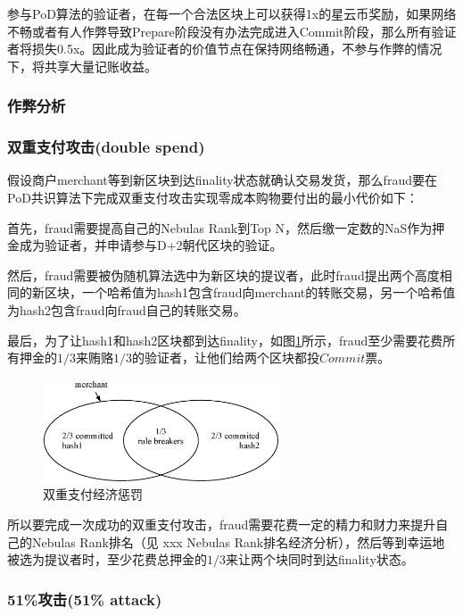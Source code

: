 参与PoD算法的验证者，在每一个合法区块上可以获得1x的星云币奖励，如果网络不畅或者有人作弊导致Prepare阶段没有办法完成进入Commit阶段，那么所有验证者将损失0.5x。因此成为验证者的价值节点在保持网络畅通，不参与作弊的情况下，将共享大量记账收益。

\subsubsection{作弊分析}
\label{pod:economic:fraud}

\subsubsection*{双重支付攻击(double spend)}
\label{pod:economic:fraud:double_spend}

假设商户merchant等到新区块到达finality状态就确认交易发货，那么fraud要在PoD共识算法下完成双重支付攻击实现零成本购物要付出的最小代价如下：

首先，fraud需要提高自己的Nebulas Rank到Top N，然后缴一定数的NaS作为押金成为验证者，并申请参与D+2朝代区块的验证。

然后，fraud需要被伪随机算法选中为新区块的提议者，此时fraud提出两个高度相同的新区块，一个哈希值为hash1包含fraud向merchant的转账交易，另一个哈希值为hash2包含fraud向fraud自己的转账交易。

最后，为了让hash1和hash2区块都到达finality，如图\ref{fig:double_spend}所示，fraud至少需要花费所有押金的$1/3$来贿赂$1/3$的验证者，让他们给两个区块都投$Commit$票。

\begin{figure}[h]
\centering
\includegraphics[width=7cm]{./figs/overlap}
\caption{双重支付经济惩罚}
\label{fig:double_spend}
\end{figure}

所以要完成一次成功的双重支付攻击，fraud需要花费一定的精力和财力来提升自己的Nebulas Rank排名（见 xxx Nebulas Rank排名经济分析），然后等到幸运地被选为提议者时，至少花费总押金的$1/3$来让两个块同时到达finality状态。

\subsubsection*{51\%攻击(51\% attack)}
\label{pod:economic:fraud:51attack}

